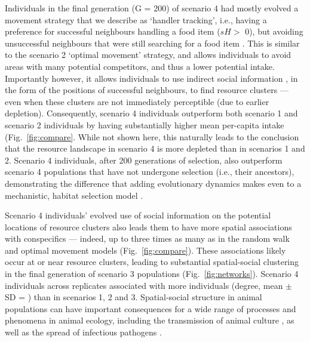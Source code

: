 Individuals in the final generation (G = 200) of scenario 4 had mostly evolved a movement strategy that we describe as `handler tracking', i.e., having a preference for successful neighbours handling a food item ($sH >$ 0), but avoiding unsuccessful neighbours that were still searching for a food item \citep[($sN <$ 0)][]{gupte2021a,gupte2022c}.
This is similar to the scenario 2 `optimal movement' strategy, and allows individuals to avoid areas with many potential competitors, and thus a lower potential intake.
Importantly however, it allows individuals to use indirect social information \citep{dall2005,spiegel2016a}, in the form of the positions of successful neighbours, to find resource clusters --- even when these clusters are not immediately perceptible (due to earlier depletion).
Consequently, scenario 4 individuals outperform both scenario 1 and scenario 2 individuals by having substantially higher mean per-capita intake (Fig.~\ref{fig:compare}.
While not shown here, this naturally leads to the conclusion that the resource landscape in scenario 4 is more depleted than in scenarios 1 and 2.
Scenario 4 individuals, after 200 generations of selection, also outperform scenario 4 populations that have not undergone selection (i.e., their ancestors), demonstrating the difference that adding evolutionary dynamics makes even to a mechanistic, habitat selection model \citep[such as][]{white2018}.

Scenario 4 individuals' evolved use of social information on the potential locations of resource clusters also leads them to have more spatial associations with conspecifics --- indeed, up to three times as many as in the random walk and optimal movement models (Fig.~\ref{fig:compare}).
These associations likely occur at or near resource clusters, leading to substantial spatial-social clustering in the final generation of scenario 3 populations (Fig.~\ref{fig:networks}).
Scenario 4 individuals across replicates associated with more individuals (degree, mean $\pm$ SD = ) than in scenarios 1, 2 and 3.
Spatial-social structure in animal populations can have important consequences for a wide range of processes and phenomena in animal ecology, including the transmission of animal culture \citep[such as foraging tactics or migration routes][]{romano2020,romano2021,jesmer2018,klump2021}, as well as the spread of infectious pathogens \citep{white2017,white2018,white2018b,webber2022,ezenwa2016,albery2020}.

